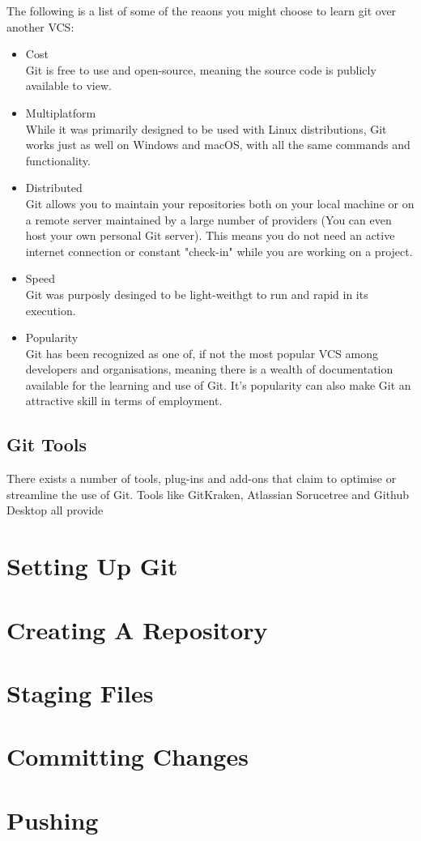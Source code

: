 \documentclass[11pt, a4paper, draft, titlepage]{article}
\begin{document}
The following is a list of some of the reaons you might choose to learn git
over another VCS:
\begin{itemize} 
\item Cost \\ 
Git is free to use and open-source, meaning the source code is publicly
available to view.  
\item Multiplatform \\ 
While it was primarily designed to be used with Linux distributions, Git works
just as well on Windows and macOS, with all the same commands and
functionality.
\item Distributed \\ 
Git allows you to maintain your repositories both on your local machine or on
a remote server maintained by a large number of providers (You can even host
your own personal Git server). This means you do not need an active internet
connection or constant "check-in" while you are working on a project.
\item Speed \\
Git was purposly desinged to be light-weithgt to run and rapid in its
execution.
\item Popularity \\ 
Git has been recognized as one of, if not the most popular VCS among
developers and organisations, meaning there is a wealth of documentation
available for the learning and use of Git. It's popularity can also make Git an
attractive skill in terms of employment.
\end{itemize}


\subsection{Git Tools} There exists a number of tools, plug-ins and add-ons
that claim to optimise or streamline the use of Git.  Tools like GitKraken,
Atlassian Sorucetree and Github Desktop all provide 

\section{Setting Up Git}

\section{Creating A Repository}

\section{Staging Files}

\section{Committing Changes}

\section{Pushing}
\end{document}
